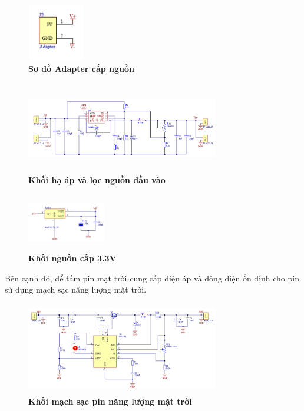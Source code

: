 \documentclass{article} %
\begin{document}
\begin{itemize}
		\begin{figure}[!ht]
			\centering
			\includegraphics[width=2.5cm,height=2.5cm]{Images/adapter.png}
			\caption[Sơ đồ Adapter cấp nguồn]{\bfseries \fontsize{12pt}{0pt}\selectfont Sơ đồ Adapter cấp nguồn}
			\label{adapter}
		\end{figure}
		\begin{figure}[!ht]
			\centering
			\includegraphics[width=8.4cm,height=4cm]{Images/haap.png}
			\caption[Khối hạ áp và lọc nguồn đầu vào]{\bfseries \fontsize{12pt}{0pt}\selectfont Khối hạ áp và lọc nguồn đầu vào}
			\label{haap}
		\end{figure}
		\begin{figure}[!ht]
			\centering
			\includegraphics[width=3.4cm,height=2.5cm]{Images/nguon3.3.png}
			\caption[Khối nguồn cấp 3.3V ]{\bfseries \fontsize{12pt}{0pt}\selectfont Khối nguồn cấp 3.3V }
			\label{nguon3.3}
		\end{figure}
		\newpage
		
		Bên cạnh đó, để tấm pin mặt trời cung cấp điện áp và dòng điện ổn định cho pin sử dụng mạch sạc năng lượng mặt trời.
		
		\begin{figure}[!ht]
			\centering
			\includegraphics[width=8.4cm,height=4cm]{Images/sunblock.png}
			\caption[Khối mạch sạc pin năng lượng mặt trời]{\bfseries \fontsize{12pt}{0pt}\selectfont Khối mạch sạc pin năng lượng mặt trời}
			\label{sunblock}
		\end{figure}
		

\end{itemize}
\end{document}
